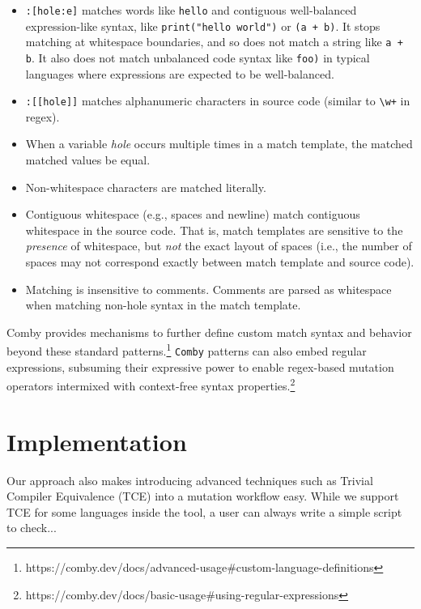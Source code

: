 \documentclass[sigconf,review, anonymous]{acmart}
\begin{document}
{\begin{itemize}
\item \texttt{\small:[hole:e]} matches words like \texttt{\small hello} and contiguous well-balanced expression-like syntax, like \texttt{\small print("hello world")} or \texttt{\small (a + b)}. It stops matching at whitespace boundaries, and so does not match a string like \texttt{\small a + b}. It also does not match unbalanced code syntax like \texttt{\small foo)} in typical languages where expressions are expected to be well-balanced.

\item \texttt{\small :[[hole]]} matches alphanumeric characters in source code (similar to \texttt{\small\textbackslash w+} in regex).

\item When a variable \emph{hole} occurs multiple times in a match template, the matched matched values be equal.

\item Non-whitespace characters are matched literally.

\item Contiguous whitespace (e.g., spaces and newline) match contiguous whitespace in the source code. That is, match templates are sensitive to the \emph{presence} of whitespace, but \emph{not} the exact layout of spaces (i.e., the number of spaces may not correspond exactly between match template and source code).

\item Matching is insensitive to comments. Comments are parsed as whitespace when matching non-hole syntax in the match template.

\end{itemize}

Comby provides mechanisms to further define custom match syntax and behavior
beyond these standard patterns.\footnote{https://comby.dev/docs/advanced-usage\#custom-language-definitions} \texttt{Comby} patterns can also embed regular expressions, subsuming their
expressive power to enable regex-based mutation operators intermixed with
context-free syntax properties.\footnote{https://comby.dev/docs/basic-usage\#using-regular-expressions}

\section{Implementation}

Our approach also makes introducing advanced techniques such as
Trivial Compiler Equivalence (TCE) into a mutation workflow easy.
While we support TCE for some languages inside the tool, a user can
always write a simple script to check...

}
\end{document}
